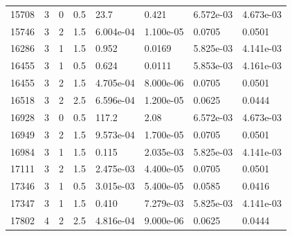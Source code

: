 \documentclass[preview]{standalone}
\begin{document}
{{{\begin{tabular}{L{1.2cm}C{1.2cm} C{0.3cm}C{0.5cm} C{1.4cm}C{1.4cm} C{1.4cm}C{1.4cm}}
  15708  &     3  & 0     & 0.5 &  23.7  & 0.421  & 6.572e-03 &  4.673e-03   \\ 
  15746  &     3  & 2     & 1.5 &  6.004e-04  & 1.100e-05  & 0.0705 &  0.0501   \\ 
  16286  &     3  & 1     & 1.5 &  0.952  & 0.0169  & 5.825e-03 &  4.141e-03   \\ 
  16455  &     3  & 1     & 0.5 &  0.624  & 0.0111  & 5.853e-03 &  4.161e-03   \\ 
  16455  &     3  & 2     & 1.5 &  4.705e-04  & 8.000e-06  & 0.0705 &  0.0501   \\ 
  16518  &     3  & 2     & 2.5 &  6.596e-04  & 1.200e-05  & 0.0625 &  0.0444   \\ 
  16928  &     3  & 0     & 0.5 &  117.2  & 2.08  & 6.572e-03 &  4.673e-03   \\ 
  16949  &     3  & 2     & 1.5 &  9.573e-04  & 1.700e-05  & 0.0705 &  0.0501   \\ 
  16984  &     3  & 1     & 1.5 &  0.115  & 2.035e-03  & 5.825e-03 &  4.141e-03   \\ 
  17111  &     3  & 2     & 1.5 &  2.475e-03  & 4.400e-05  & 0.0705 &  0.0501   \\ 
  17346  &     3  & 1     & 0.5 &  3.015e-03  & 5.400e-05  & 0.0585 &  0.0416   \\ 
  17347  &     3  & 1     & 1.5 &  0.410  & 7.279e-03  & 5.825e-03 &  4.141e-03   \\ 
  17802  &     4  & 2     & 2.5 &  4.816e-04  & 9.000e-06  & 0.0625 &  0.0444   \\ 
\hline 
\end{tabular} 

}}}
\end{document}
